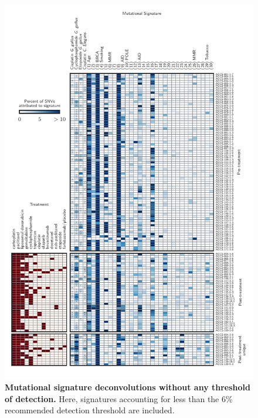 \documentclass{article}
\begin{document}
\begin{figure}
\centering
\includegraphics[scale=1.0]{../figures/supplementary_signatures_no_cutoff.pdf}
\caption{\textbf{Mutational signature deconvolutions without any threshold of detection.} Here, signatures accounting for less than the 6\% recommended detection threshold are included.}
\label{fig:supplementary_signatures_no_cutoff}
\end{figure}
\end{document}
